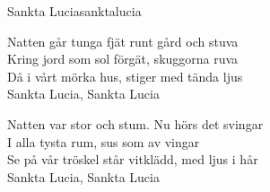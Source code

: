 \begin{song}{Sankta Lucia}{sanktalucia}
\begin{vers}
Natten går tunga fjät runt gård och stuva\\
Kring jord som sol förgät, skuggorna ruva\\
Då i vårt mörka hus, stiger med tända ljus\\
Sankta Lucia, Sankta Lucia\\
\end{vers}
\begin{vers}
Natten var stor och stum. Nu hörs det svingar\\
I alla tysta rum, sus som av vingar\\
\repopen Se på vår tröskel står vitklädd, med ljus i hår\\
Sankta Lucia, Sankta Lucia\repclose\\
\end{vers}
\end{song}
